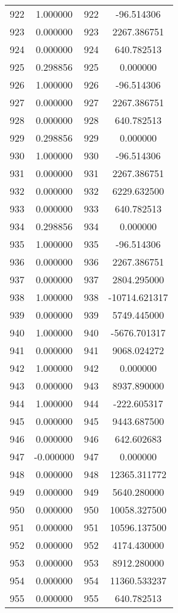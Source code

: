 \documentclass[12pt]{article}
\begin{document}
\begin{longtable}{@{}cccc@{}}
922 & 1.000000 & 922 & -96.514306 \\
923 & 0.000000 & 923 & 2267.386751 \\
924 & 0.000000 & 924 & 640.782513 \\
925 & 0.298856 & 925 & 0.000000 \\
926 & 1.000000 & 926 & -96.514306 \\
927 & 0.000000 & 927 & 2267.386751 \\
928 & 0.000000 & 928 & 640.782513 \\
929 & 0.298856 & 929 & 0.000000 \\
930 & 1.000000 & 930 & -96.514306 \\
931 & 0.000000 & 931 & 2267.386751 \\
932 & 0.000000 & 932 & 6229.632500 \\
933 & 0.000000 & 933 & 640.782513 \\
934 & 0.298856 & 934 & 0.000000 \\
935 & 1.000000 & 935 & -96.514306 \\
936 & 0.000000 & 936 & 2267.386751 \\
937 & 0.000000 & 937 & 2804.295000 \\
938 & 1.000000 & 938 & -10714.621317 \\
939 & 0.000000 & 939 & 5749.445000 \\
940 & 1.000000 & 940 & -5676.701317 \\
941 & 0.000000 & 941 & 9068.024272 \\
942 & 1.000000 & 942 & 0.000000 \\
943 & 0.000000 & 943 & 8937.890000 \\
944 & 1.000000 & 944 & -222.605317 \\
945 & 0.000000 & 945 & 9443.687500 \\
946 & 0.000000 & 946 & 642.602683 \\
947 & -0.000000 & 947 & 0.000000 \\
948 & 0.000000 & 948 & 12365.311772 \\
949 & 0.000000 & 949 & 5640.280000 \\
950 & 0.000000 & 950 & 10058.327500 \\
951 & 0.000000 & 951 & 10596.137500 \\
952 & 0.000000 & 952 & 4174.430000 \\
953 & 0.000000 & 953 & 8912.280000 \\
954 & 0.000000 & 954 & 11360.533237 \\
955 & 0.000000 & 955 & 640.782513 \\

\end{longtable}
\end{document}
